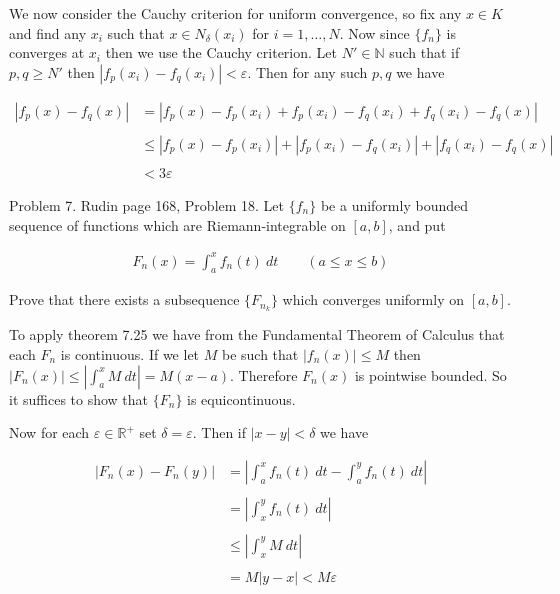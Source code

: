 \documentclass{article}
\begin{document}
  We now consider the Cauchy criterion for uniform convergence, so fix any $x\in K$ and find any $x_i$ such that $x\in N_\delta(x_i)$ for $i=1,\dots,N$.  Now since $\{f_n\}$ is converges at $x_i$ then we use the Cauchy criterion.  Let $N'\in\mathbb N$ such that if $p,q\ge N'$ then $|f_p(x_i)-f_q(x_i)|<\varepsilon$.  Then for any such $p,q$ we have 

  \begin{align*}
    |f_p(x)-f_q(x)| &= |f_p(x)-f_p(x_i)+f_p(x_i)-f_q(x_i)+f_q(x_i)-f_q(x)| \\\\
    &\le |f_p(x)-f_p(x_i)|+|f_p(x_i)-f_q(x_i)|+|f_q(x_i)-f_q(x)| \\\\
    &< 3\varepsilon
  \end{align*}

\pagebreak
  
  {\Large \color{Sepia} Problem 7. Rudin page 168, Problem 18. Let $\{f_n\}$ be a uniformly bounded sequence of functions which are Riemann-integrable on $[a,b]$, and put 

  \begin{align*}
      F_n(x) = \int_a^x f_n(t)\ dt \qquad (a\le x\le b)
  \end{align*}

  Prove that there exists a subsequence $\{F_{n_k}\}$ which converges uniformly on $[a,b]$.  }

  \vspace{1cm} 

  To apply theorem 7.25 we have from the Fundamental Theorem of Calculus that each $F_n$ is continuous.  If we let $M$ be such that $|f_n(x)|\le M$ then $|F_n(x)| \le \left|\int_a^x M \ dt \right| =M(x-a)$.  Therefore $F_n(x)$ is pointwise bounded.  So it suffices to show that $\{F_n\}$ is equicontinuous.  

  Now for each $\varepsilon\in\mathbb R^+$ set $\delta=\varepsilon$.  Then if $|x-y|<\delta$ we have 

  \begin{align*}
    \left|F_n(x)-F_n(y)\right| &= \left|\int_a^x f_n(t)\ dt-\int_a^y f_n(t)\ dt\right| \\\\
    &= \left|\int_x^y f_n(t)\ dt \right| \\\\
    &\le \left|\int_x^y M\ dt \right| \\\\
    &= M|y-x| < M\varepsilon
  \end{align*}
\end{document}
